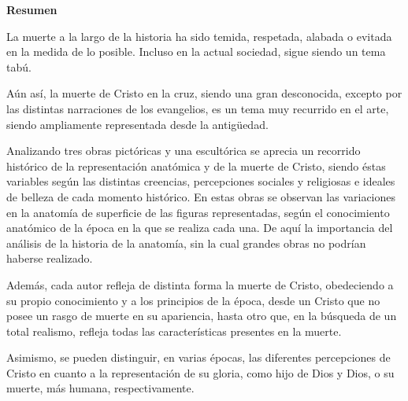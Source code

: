 \textbf{Resumen}

La muerte a la largo de la historia ha sido temida, respetada, alabada o evitada en la medida de lo posible. Incluso en la actual sociedad, %
sigue siendo un tema tabú.

Aún así, la muerte de Cristo en la cruz, siendo una gran desconocida, excepto por las distintas narraciones de los evangelios, es un tema muy recurrido en el arte, siendo ampliamente representada desde la antigüedad.

Analizando tres obras pictóricas y una escultórica se aprecia un recorrido histórico de la representación anatómica y de la muerte de Cristo, siendo éstas variables según las distintas creencias, percepciones sociales y religiosas e ideales de belleza de cada momento histórico. En estas obras se observan las variaciones en la anatomía de superficie de las figuras representadas, según el conocimiento anatómico de la época en la que se realiza cada una. De aquí la importancia del análisis de la historia de la anatomía, sin la cual grandes obras no podrían haberse realizado.


Además, cada autor refleja de distinta forma la muerte de Cristo, obedeciendo a su propio conocimiento y a los principios de la época, desde un Cristo que no posee un rasgo de muerte en su apariencia, hasta otro que, en la búsqueda de un total realismo, refleja %
todas las características presentes en la muerte. %


Asimismo, se pueden distinguir, en varias épocas, las diferentes percepciones de Cristo en cuanto a la representación de su gloria, como hijo de Dios y Dios, o su muerte, más humana, respectivamente.


